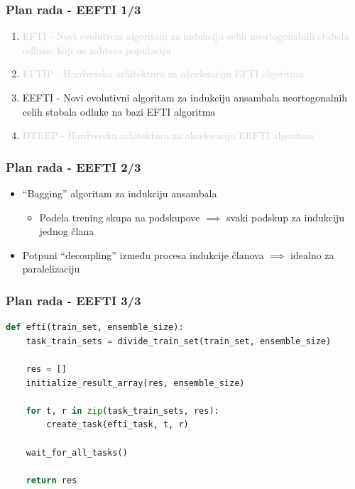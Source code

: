 \documentclass{beamer}
\newcommand{\light}[1]{\textcolor{lightgray}{#1}}
\begin{document}

\begin{frame}
\frametitle{Plan rada - EEFTI 1/3}
\begin{enumerate}
\setlength{\itemsep}{\fill}
\item\light{EFTI - Novi evolutivni algoritam za indukciju celih neortogonalnih stabala
odluke, koji ne zahteva populaciju}
\item\light{EFTIP - Hardverska arhitektura za akceleraciju EFTI algoritma}
\item EEFTI - Novi evolutivni algoritam za indukciju ansambala neortogonalnih celih
stabala odluke na bazi EFTI algoritma
\item\light{DTEEP - Hardverska arhitektura za akceleraciju EEFTI algoritma}
\end{enumerate}
\end{frame}


\begin{frame}
\frametitle{Plan rada - EEFTI 2/3}
\begin{itemize}
\setlength{\itemsep}{\fill}
\item ``Bagging'' algoritam za indukciju ansambala
\begin{itemize}
\item Podela trening skupa na podskupove $\implies$ svaki podskup za indukciju jednog člana
\end{itemize}
\vspace{1em}
\vspace{1em}
\item Potpuni ``decoupling'' između procesa indukcije članova $\implies$ idealno za paralelizaciju
\end{itemize}
\end{frame}


\begin{frame}[fragile]
\frametitle{Plan rada - EEFTI 3/3}
\small\begin{lstlisting}[language=Python]
def efti(train_set, ensemble_size):
    task_train_sets = divide_train_set(train_set, ensemble_size)

    res = []
    initialize_result_array(res, ensemble_size)

    for t, r in zip(task_train_sets, res):
        create_task(efti_task, t, r)

    wait_for_all_tasks()

    return res
\end{lstlisting}
\end{frame}
\end{document}
